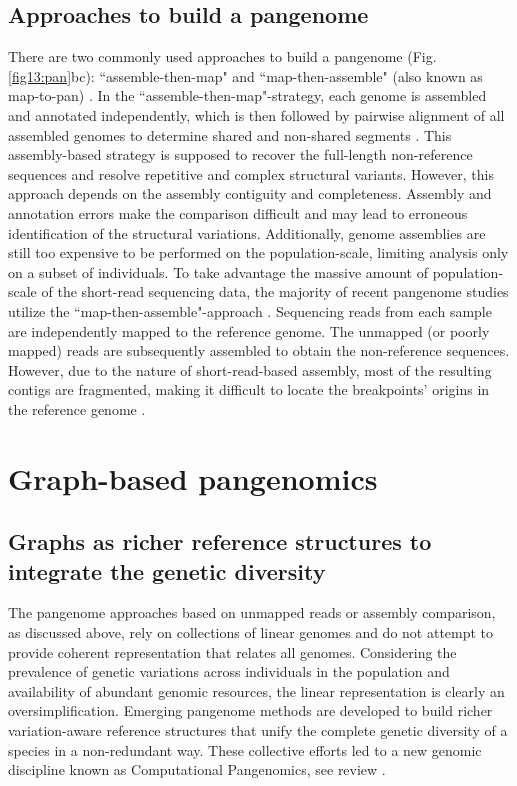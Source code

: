 \documentclass[../main.tex]{subfiles}
\begin{document}
\subsection*{Approaches to build a pangenome}
There are two commonly used approaches to build a pangenome (Fig. \ref{fig13:pan}bc): “assemble-then-map" and “map-then-assemble" (also known as map-to-pan) \citep{golicz2020pangenomics}. In the “assemble-then-map"-strategy, each genome is assembled and annotated independently, which is then followed by pairwise alignment of all assembled genomes to determine shared and non-shared segments \citep{duan2019hupan,li2019towards,eisfeldt2020discovery}. This assembly-based strategy is supposed to recover the full-length non-reference sequences and resolve repetitive and complex structural variants. However, this approach depends on the assembly contiguity and completeness. Assembly and annotation errors make the comparison difficult and may lead to erroneous identification of the structural variations. Additionally, genome assemblies are still too expensive to be performed on the population-scale, limiting analysis only on a subset of individuals. To take advantage the massive amount of population-scale of the short-read sequencing data, the majority of  recent pangenome studies utilize the “map-then-assemble"-approach \citep{holden2018assembly,laine2019exploring,sherman2019assembly}. Sequencing reads from each sample are independently mapped to the reference genome. The  unmapped (or poorly mapped) reads are subsequently assembled to obtain the non-reference sequences. However, due to the nature of short-read-based assembly, most of the resulting contigs are fragmented, making it difficult to locate the breakpoints’ origins in the reference genome \citep{sherman2019assembly}. 

\section{Graph-based pangenomics}

\subsection*{Graphs as richer reference structures to integrate the genetic diversity}

The pangenome approaches based on unmapped reads or assembly comparison, as discussed above, rely on collections of linear genomes and do not attempt to provide coherent representation that relates all genomes. Considering the prevalence of genetic variations across individuals in the population and availability of abundant genomic resources, the linear representation is clearly an oversimplification. Emerging pangenome methods are developed to build richer variation-aware reference structures that unify the complete genetic diversity of a species in a non-redundant way. These collective efforts led to a new genomic discipline known as Computational Pangenomics, see review \citep{paten2017genome,computational2018computational,eizenga2020pangenome}.
\end{document}
